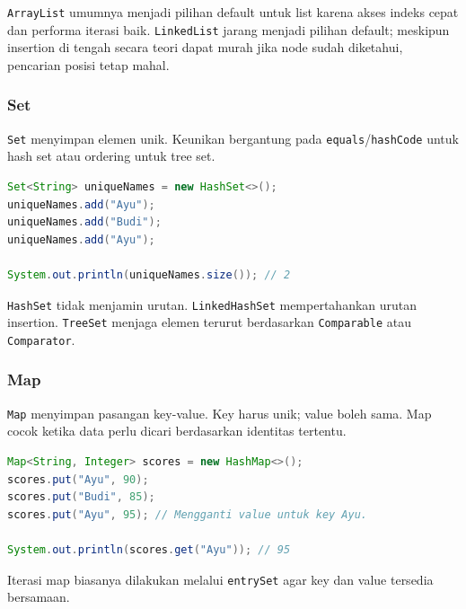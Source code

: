 \texttt{ArrayList} umumnya menjadi pilihan default untuk list karena akses indeks cepat dan performa iterasi baik. \texttt{LinkedList} jarang menjadi pilihan default; meskipun insertion di tengah secara teori dapat murah jika node sudah diketahui, pencarian posisi tetap mahal.

\subsubsection{Set}

\begin{jawab}
\texttt{Set} menyimpan elemen unik. Keunikan bergantung pada \texttt{equals}/\texttt{hashCode} untuk hash set atau ordering untuk tree set.
\end{jawab}

\begin{lstlisting}[language=Java, caption={Penggunaan Set untuk menghapus duplikasi}, label={lst:set-basic}]
Set<String> uniqueNames = new HashSet<>();
uniqueNames.add("Ayu");
uniqueNames.add("Budi");
uniqueNames.add("Ayu");

System.out.println(uniqueNames.size()); // 2
\end{lstlisting}

\texttt{HashSet} tidak menjamin urutan. \texttt{LinkedHashSet} mempertahankan urutan insertion. \texttt{TreeSet} menjaga elemen terurut berdasarkan \texttt{Comparable} atau \texttt{Comparator}.

\subsubsection{Map}

\begin{jawab}
\texttt{Map} menyimpan pasangan key-value. Key harus unik; value boleh sama. Map cocok ketika data perlu dicari berdasarkan identitas tertentu.
\end{jawab}

\begin{lstlisting}[language=Java, caption={Penggunaan Map}, label={lst:map-basic}]
Map<String, Integer> scores = new HashMap<>();
scores.put("Ayu", 90);
scores.put("Budi", 85);
scores.put("Ayu", 95); // Mengganti value untuk key Ayu.

System.out.println(scores.get("Ayu")); // 95
\end{lstlisting}

Iterasi map biasanya dilakukan melalui \texttt{entrySet} agar key dan value tersedia bersamaan.

